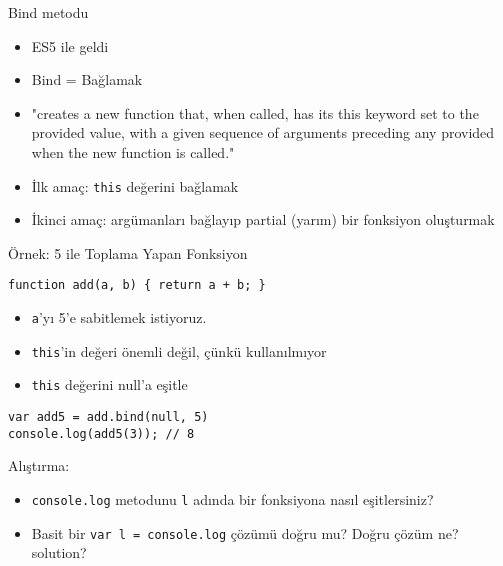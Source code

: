 \documentclass[presentation]{beamer}
\begin{document}
\begin{frame}[fragile,label={sec:org6d3bb7e}]{Bind metodu}
 \begin{itemize}
\item ES5 ile geldi
\item Bind = Bağlamak
\item "creates a new function that, when called, has its this keyword set to the
provided value, with a given sequence of arguments preceding any provided
when the new function is called."
\item İlk amaç: \texttt{this} değerini bağlamak
\item İkinci amaç: argümanları bağlayıp \alert{partial} (yarım) bir fonksiyon oluşturmak
\end{itemize}
\end{frame}

\begin{frame}[fragile,label={sec:org60448d5}]{Örnek: 5 ile Toplama Yapan Fonksiyon}
 \begin{verbatim}
function add(a, b) { return a + b; }
\end{verbatim}

\begin{itemize}
\item \texttt{a}'yı 5'e sabitlemek istiyoruz.
\item \texttt{this}'in değeri önemli değil, çünkü kullanılmıyor
\item \texttt{this} değerini null'a eşitle
\end{itemize}

\begin{verbatim}
var add5 = add.bind(null, 5)
console.log(add5(3)); // 8
\end{verbatim}
\end{frame}


\begin{frame}[fragile,label={sec:org687e8e4}]{Alıştırma:}
 \begin{itemize}
\item \texttt{console.log} metodunu \texttt{l} adında bir fonksiyona nasıl eşitlersiniz?
\item Basit bir \texttt{var l = console.log} çözümü doğru mu? Doğru çözüm ne?
solution?
\end{itemize}
\end{frame}
\end{document}
